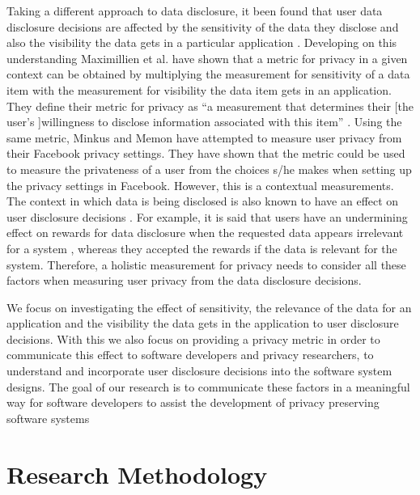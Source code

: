 \documentclass[conference]{IEEEtran}
\begin{document}
Taking a different approach to data disclosure, it been found that user data disclosure decisions are affected by the sensitivity of the data they disclose and also the visibility the data gets in a particular application \cite {maximilien2009privacy}. Developing on this understanding Maximillien et al. \cite {maximilien2009privacy} have shown that a metric for privacy in a given context can be obtained by multiplying the measurement for sensitivity of a data item with the measurement for visibility the data item gets in an application. They define their metric for privacy as \enquote{a measurement that determines their [the user's ]willingness to disclose information associated with this item} \cite {maximilien2009privacy}. Using the same metric, Minkus and Memon \cite{minkus2014scale} have attempted to measure user privacy from their Facebook privacy settings. They have shown that the metric could be used to measure the privateness of a user from the choices s/he makes when setting up the privacy settings in Facebook. However, this is a contextual measurements. The context in which data is being disclosed \cite {nissenbaum2009privacy, john2010strangers} is also known to have an effect on user disclosure decisions \cite {knijnenburg2013making}. For example, it is said that users have an undermining effect on rewards for data disclosure when the requested data appears irrelevant for a system \cite {li2010understanding}, whereas they accepted the rewards if the data is relevant for the system. Therefore, a holistic measurement for privacy needs to consider all these factors when measuring user privacy from the data disclosure decisions. 

We focus on investigating the effect of sensitivity, the relevance of the data for an application and the visibility the data gets in the application to user disclosure decisions. With this we also focus on providing a privacy metric in order to communicate this effect to software developers and privacy researchers, to understand and incorporate user disclosure decisions into the software system designs. The goal of our research is to communicate these factors in a meaningful way for software developers to assist the development of privacy preserving software systems


\section {Research Methodology}
\end{document}
